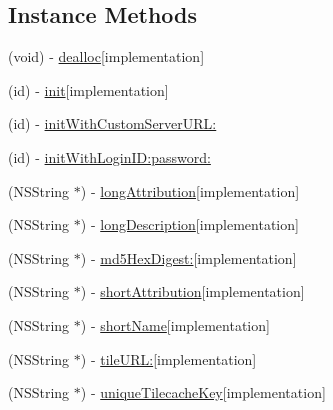\subsection*{Instance Methods}
\begin{DoxyCompactItemize}
\item 
(void) -\/ \hyperlink{interface_r_m_spatial_cloud_map_source_a6aeb222420a51b8b1a7f8cb13c2797e6}{dealloc}{\ttfamily  \mbox{[}implementation\mbox{]}}
\item 
(id) -\/ \hyperlink{interface_r_m_spatial_cloud_map_source_a69952598d6a2cc04c99a629a0df9588f}{init}{\ttfamily  \mbox{[}implementation\mbox{]}}
\item 
(id) -\/ \hyperlink{interface_r_m_spatial_cloud_map_source_a3eedfc79d2f0d57b46cf4d2b7ed378b9}{init\-With\-Custom\-Server\-U\-R\-L\-:}
\item 
(id) -\/ \hyperlink{interface_r_m_spatial_cloud_map_source_ad45f27222bae12efa9e46edd1282af1d}{init\-With\-Login\-I\-D\-:password\-:}
\item 
(N\-S\-String $\ast$) -\/ \hyperlink{interface_r_m_spatial_cloud_map_source_aca8e3d49e1f76041d359f4b3f23f455b}{long\-Attribution}{\ttfamily  \mbox{[}implementation\mbox{]}}
\item 
(N\-S\-String $\ast$) -\/ \hyperlink{interface_r_m_spatial_cloud_map_source_a92a59ece1bab8aae7c39fd8f26050930}{long\-Description}{\ttfamily  \mbox{[}implementation\mbox{]}}
\item 
(N\-S\-String $\ast$) -\/ \hyperlink{interface_r_m_spatial_cloud_map_source_ab0964f647cdc6e0e12e650b718c97843}{md5\-Hex\-Digest\-:}{\ttfamily  \mbox{[}implementation\mbox{]}}
\item 
(N\-S\-String $\ast$) -\/ \hyperlink{interface_r_m_spatial_cloud_map_source_a54c0d41fc0dcf7a11dac1f9378098170}{short\-Attribution}{\ttfamily  \mbox{[}implementation\mbox{]}}
\item 
(N\-S\-String $\ast$) -\/ \hyperlink{interface_r_m_spatial_cloud_map_source_a8979840374ba56ae17b72b53877071a8}{short\-Name}{\ttfamily  \mbox{[}implementation\mbox{]}}
\item 
(N\-S\-String $\ast$) -\/ \hyperlink{interface_r_m_spatial_cloud_map_source_a8a29a9ae76880f3ceafb2b03fe2993be}{tile\-U\-R\-L\-:}{\ttfamily  \mbox{[}implementation\mbox{]}}
\item 
(N\-S\-String $\ast$) -\/ \hyperlink{interface_r_m_spatial_cloud_map_source_acb584cc15f37012168e4a81be5fb1a5d}{unique\-Tilecache\-Key}{\ttfamily  \mbox{[}implementation\mbox{]}}
\end{DoxyCompactItemize}
